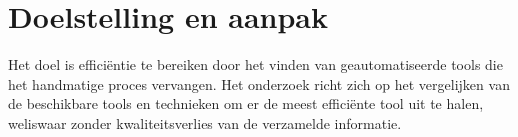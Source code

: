
\section{Doelstelling en aanpak}
Het doel is efficiëntie te bereiken door het vinden van geautomatiseerde tools die het handmatige proces vervangen. 
Het onderzoek richt zich op het vergelijken van de beschikbare tools en technieken om er de meest efficiënte tool uit te halen, weliswaar zonder kwaliteitsverlies van de verzamelde informatie.





